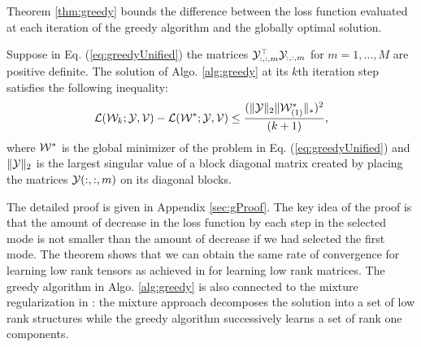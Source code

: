 
Theorem \ref{thm:greedy} bounds the difference between the loss function evaluated at each iteration of the greedy algorithm and the globally optimal solution.

\begin{theorem}\label{thm:greedy}
Suppose in Eq. (\ref{eq:greedyUnified}) the matrices ${\mathcal Y}_{:, :, m}^{\top}{\mathcal Y}_{:, :, m}$ for $m = 1, \ldots, M$ are positive definite.  The solution of Algo. \ref{alg:greedy} at its $k$th iteration step satisfies the following inequality:
\begin{equation}
\mathcal{L}({\mathcal W}_{k};{\mathcal Y},{\mathcal V}) - \mathcal{L}({\mathcal W}^{*};{\mathcal Y},{\mathcal V}) \leq \frac{ (\| {\mathcal Y} \|_{2}\|{\mathcal W}_{(1)}^*\|_{*})^2 }{(k+1)},
\end{equation}
\noindent where ${\mathcal W}^*$ is the global minimizer of the problem in Eq. (\ref{eq:greedyUnified}) and $\| {\mathcal Y}\|_{2}$ is the largest singular value of a block diagonal matrix created by placing the matrices ${\mathcal Y}(:, :, m)$ on its diagonal blocks.
\end{theorem}

The detailed proof is given in Appendix \ref{sec:gProof}. The key idea of the proof is that the amount of decrease in the loss function by each step in the selected mode is not smaller than the amount of decrease if we had selected the first mode. The theorem shows that we can obtain the same rate of convergence for learning low rank tensors as achieved in \cite{ShalevShwartz2010} for learning low rank matrices. The greedy algorithm in Algo. \ref{alg:greedy} is also connected to the mixture regularization in \cite{tomioka2010estimation}: the mixture approach decomposes the solution into a set of low rank structures while the greedy algorithm successively learns a set of rank one components. 


